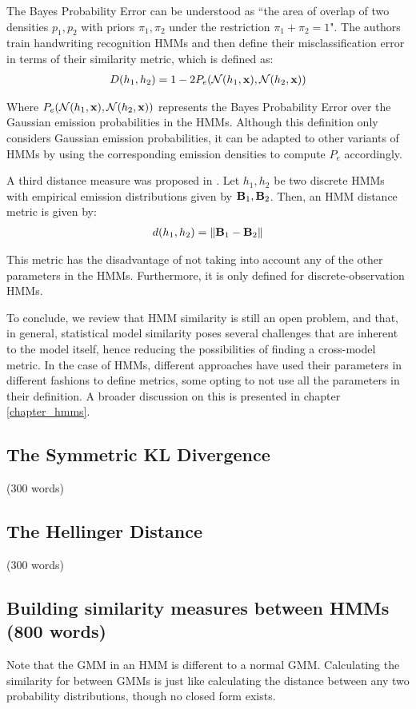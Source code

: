 \documentclass[../main.tex]{subfiles}
\begin{document}
\par The Bayes Probability Error can be understood as ``the area of overlap of two densities $p_1, p_2$ with priors $\pi_1, \pi_2$ under the restriction $\pi_1+\pi_2 = 1$". The authors train handwriting recognition HMMs and then define their misclassification error in terms of their similarity metric, which is defined as:
\begin{align*}
D(h_1, h_2) = 1 - 2P_e{(\mathcal{N}(h_1, \mathbf{x}), \mathcal{N}(h_2, \mathbf{x}))}
\end{align*}
\par Where $P_e{(\mathcal{N}(h_1, \mathbf{x}), \mathcal{N}(h_2, \mathbf{x}))}$ represents the Bayes Probability Error over the Gaussian emission probabilities in the HMMs. Although this definition only considers Gaussian emission probabilities, it can be adapted to other variants of HMMs by using the corresponding emission densities to compute $P_e$ accordingly.
\par A third distance measure was proposed in \cite{Juang1985}. Let $h_1, h_2$ be two discrete HMMs with empirical emission distributions given by $\mathbf{B}_1, \mathbf{B}_2$. Then, an HMM distance metric is given by:
\begin{align*}
d(h_1, h_2) = \left\lVert\mathbf{B}_1 - \mathbf{B}_2\right\rVert
\end{align*}
\par This metric has the disadvantage of not taking into account any of the other parameters in the HMMs. Furthermore, it is only defined for discrete-observation HMMs.
\par To conclude, we review that HMM similarity is still an open problem, and that, in general, statistical model similarity poses several challenges that are inherent to the model itself, hence reducing the possibilities of finding a cross-model metric. In the case of HMMs, different approaches have used their parameters in different fashions to define metrics, some opting to not use all the parameters in their definition. A broader discussion on this is presented in chapter \ref{chapter_hmms}.
\subsection{The Symmetric KL Divergence} (300 words)
\subsection{The Hellinger Distance} (300 words)
\subsection{Building similarity measures between HMMs (800 words) } 
Note that the GMM in an HMM is different to a normal GMM. Calculating the similarity for between GMMs is just like calculating the distance between any two probability distributions, though no closed form exists. 
\end{document}
